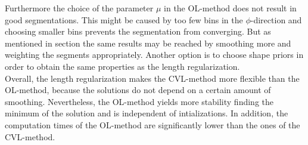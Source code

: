Furthermore the choice of the parameter $\mu$ in the OL-method does not result in good segmentations. This might be caused by too few bins in the $\phi$-direction and choosing smaller bins prevents the segmentation from converging. But as mentioned in section  the same results may be reached by smoothing more and weighting the segments appropriately. Another option is to choose shape priors in order to obtain the same properties as the length regularization.\\

Overall, the length regularization makes the CVL-method more flexible than the OL-method, because the solutions do not depend on a certain amount of smoothing. Nevertheless, the OL-method yields more stability finding the minimum of the solution and is independent of intializations. In addition, the computation times of the OL-method are significantly lower than the ones of the CVL-method.